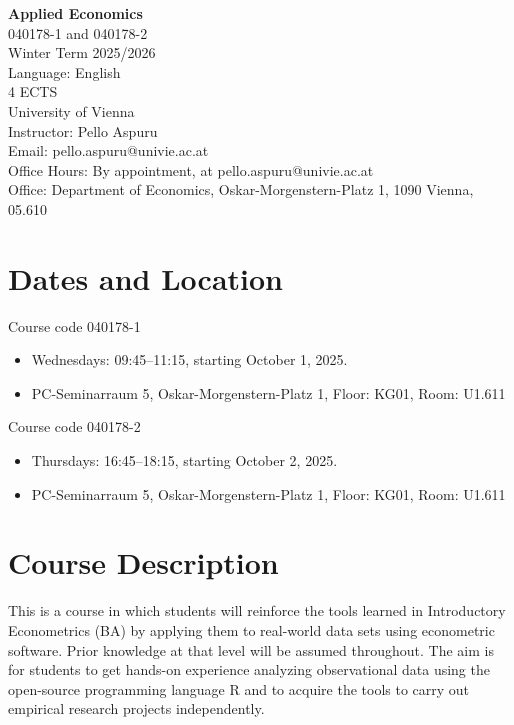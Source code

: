 \documentclass[11pt]{article}
\makeatletter
\newcommand{\university}{University of Vienna}
\newcommand{\coursename}{Applied Economics}
\newcommand{\coursecode}{040178-1 and 040178-2}
\newcommand{\semester}{Winter Term 2025/2026}
\newcommand{\instructor}{Pello Aspuru}
\newcommand{\email}{pello.aspuru@univie.ac.at}
\newcommand{\officehours}{By appointment, at pello.aspuru@univie.ac.at}
\newcommand{\office}{Department of Economics, Oskar-Morgenstern-Platz 1, 1090 Vienna, 05.610}
\newcommand{\courselanguage}{English}
\newcommand{\countECTS}{4 ECTS}
\makeatother
\begin{document}
\begin{center}
    {\Large \textbf{\coursename}} \\
    \coursecode \\
    \semester \\
    Language: \courselanguage \\
    \countECTS \\
    \vspace{0.3cm}
    {\university} \\
    \vspace{0.5cm}
    Instructor: \instructor \\
    Email: \email \\
    Office Hours: \officehours \\
    Office: \office \\
\end{center}

\section{Dates and Location}

Course code 040178-1
\begin{itemize}
    \item Wednesdays: 09:45--11:15, starting October 1, 2025.
    \item PC-Seminarraum 5, Oskar-Morgenstern-Platz 1, Floor: KG01, Room: U1.611
\end{itemize}

Course code 040178-2
\begin{itemize}
    \item Thursdays: 16:45--18:15, starting October 2, 2025.
    \item PC-Seminarraum 5, Oskar-Morgenstern-Platz 1, Floor: KG01, Room: U1.611
\end{itemize}

\section{Course Description}
This is a course in which students will reinforce the tools learned in Introductory Econometrics (BA) by applying them to real-world data sets using econometric software. Prior knowledge at that level will be assumed throughout. The aim is for students to get hands-on experience analyzing observational data using the open-source programming language R and to acquire the tools to carry out empirical research projects independently.
\end{document}
